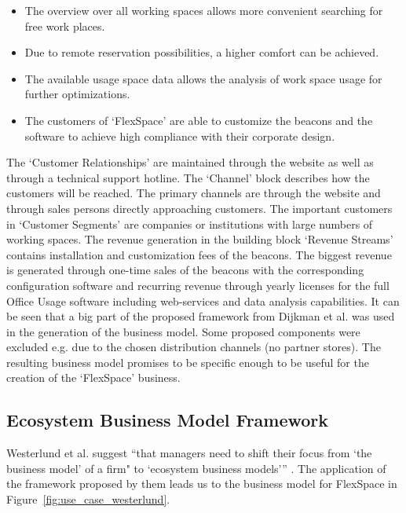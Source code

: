		\begin{itemize}
			\item The overview over all working spaces allows more convenient searching for free work places.
			\item Due to remote reservation possibilities, a higher comfort can be achieved. 
			\item The available usage space data allows the analysis of work space usage for further optimizations.
			\item The customers of `FlexSpace' are able to customize the beacons and the software to achieve high compliance with their corporate design.  
		\end{itemize}  

		The `Customer Relationships' are maintained through the website as well as through a technical support hotline. The `Channel' block describes how the customers will be reached. The primary channels are through the website and through sales persons directly approaching customers. The important customers in `Customer Segments' are companies or institutions with large numbers of working spaces. The revenue generation in the building block `Revenue Streams' contains installation and customization fees of the beacons. The biggest revenue is generated through one-time sales of the beacons with the corresponding configuration software and recurring revenue through yearly licenses for the full Office Usage software including web-services and data analysis capabilities. It can be seen that a big part of the proposed framework from Dijkman et al. was used in the generation of the business model. Some proposed components were excluded e.g. due to the chosen distribution channels (no partner stores). The resulting business model promises to be specific enough to be useful for the creation of the `FlexSpace' business. 

	\subsection{Ecosystem Business Model Framework}
		Westerlund et al. suggest ``that managers need to shift their focus from `the business model' of a firm" to `ecosystem business models''' \cite[p.~8]{westerlund}. The application of the framework proposed by them leads us to the business model for FlexSpace in Figure~\ref{fig:use_case_westerlund}.


